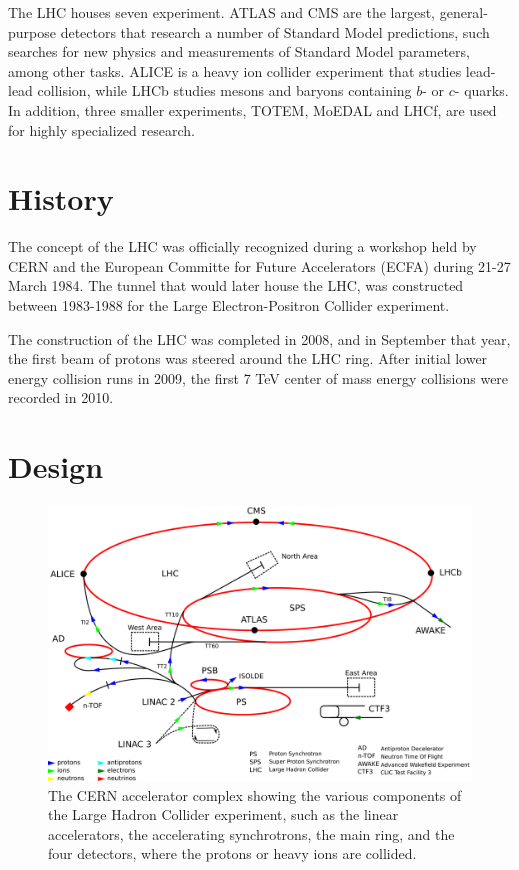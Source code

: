 \documentclass[12pt,a4paper,openright,twoside]{report}
\begin{document}
The LHC houses seven experiment. ATLAS and CMS are the largest, general-purpose detectors that research a number of Standard Model predictions, such searches for new physics and measurements of Standard Model parameters, among other tasks. ALICE is a heavy ion collider experiment that studies lead-lead collision, while LHCb studies mesons and baryons containing $b$- or $c$- quarks. In addition, three smaller experiments, TOTEM, MoEDAL and LHCf, are used for highly specialized research.

\section{History}
The concept of the LHC was officially recognized during a workshop held by CERN and the European Committe for Future Accelerators (ECFA) during 21-27 March 1984. The tunnel that would later house the LHC, was constructed between 1983-1988 for the Large Electron-Positron Collider experiment.

The construction of the LHC was completed in 2008, and in September that year, the first beam of protons was steered around the LHC ring. After initial lower energy collision runs in 2009, the first 7 TeV center of mass energy collisions were recorded in 2010.
\vfill

\section{Design}
\begin{figure}[H]
\centering
	\includegraphics[width=0.9\linewidth]{Cern_accelerator_complex.png}
	\caption{The CERN accelerator complex showing the various components of the Large Hadron Collider experiment, such as the linear accelerators, the accelerating synchrotrons, the main ring, and the four detectors, where the protons or heavy ions are collided.}
		\label{fig:LHCring}
\end{figure}
\end{document}
